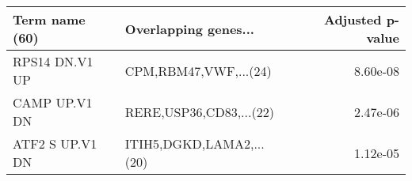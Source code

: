 \begin{tabular}{llr}
\toprule
 Term name (60) &     Overlapping genes... &  Adjusted p-value \\
\midrule
 RPS14 DN.V1 UP &    CPM,RBM47,VWF,...(24) &          8.60e-08 \\
  CAMP UP.V1 DN &  RERE,USP36,CD83,...(22) &          2.47e-06 \\
ATF2 S UP.V1 DN & ITIH5,DGKD,LAMA2,...(20) &          1.12e-05 \\
\bottomrule
\end{tabular}
